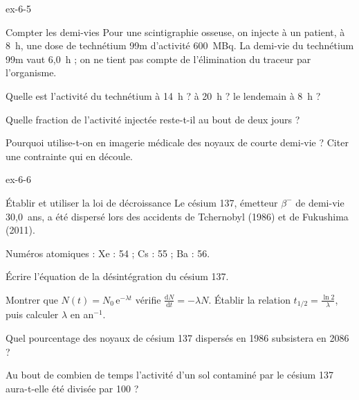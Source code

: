 \begin{blocLivre}{ex-6-5}
\begin{exercice}[1]{Compter les demi-vies}
Pour une scintigraphie osseuse, on injecte à un patient, à 8~h, une dose de technétium 99m d'activité 600~MBq.
La demi-vie du technétium 99m vaut 6,0~h ; on ne tient pas compte de l'élimination du traceur par l'organisme.
\begin{questions}
\item Quelle est l'activité du technétium à 14~h ? à 20~h ? le lendemain à 8~h ?
\item Quelle fraction de l'activité injectée reste-t-il au bout de deux jours ?
\item Pourquoi utilise-t-on en imagerie médicale des noyaux de courte demi-vie ? Citer une contrainte qui en découle.
\end{questions}
\end{exercice}
\end{blocLivre}
\begin{blocLivre}{ex-6-6}
\begin{exercice}[2]{Établir et utiliser la loi de décroissance}
Le césium 137, émetteur $\beta^-$ de demi-vie 30,0~ans, a été dispersé lors des accidents de Tchernobyl (1986) et de
Fukushima (2011).
\begin{donnees}
Numéros atomiques : Xe : 54 ; Cs : 55 ; Ba : 56.
\end{donnees}
\begin{questions}
\item Écrire l'équation de la désintégration du césium 137.
\item Montrer que $N(t)=N_0\,\mathrm{e}^{-\lambda t}$ vérifie $\frac{\mathrm{d}N}{\mathrm{d}t}=-\lambda N$. Établir la relation
$t_{1/2}=\frac{\ln2}{\lambda}$, puis calculer $\lambda$ en an$^{-1}$.
\item Quel pourcentage des noyaux de césium 137 dispersés en 1986 subsistera en 2086 ?
\item Au bout de combien de temps l'activité d'un sol contaminé par le césium 137 aura-t-elle été divisée par 100 ?
\end{questions}
\end{exercice}
\end{blocLivre}
